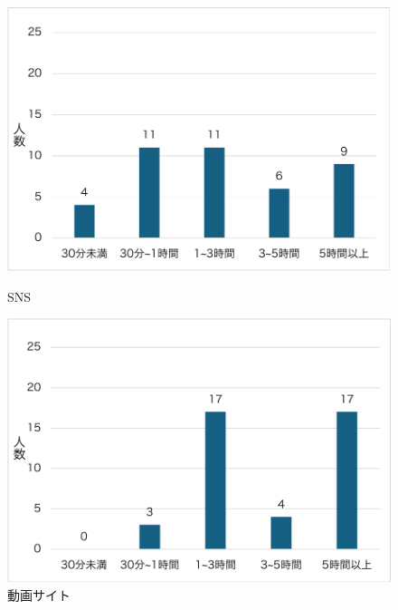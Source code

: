 \documentclass[12pt,a4j,titlepage]{ltjsarticle}
\begin{document}
\begin{figure}[!htb]
\centering
\begin{minipage}[b]{0.49\columnwidth}
    \centering
    \includegraphics[width=1.0\columnwidth]{SNS.pdf}
    \caption{SNS}
    \label{fig:sns}
\end{minipage}
\begin{minipage}[b]{0.49\columnwidth}
    \centering
    \includegraphics[width=1.0\columnwidth]{動画サイト使用時間.pdf}
    \caption{動画サイト}
    \label{fig:douga}
\end{minipage}
\end{figure}
\end{document}
